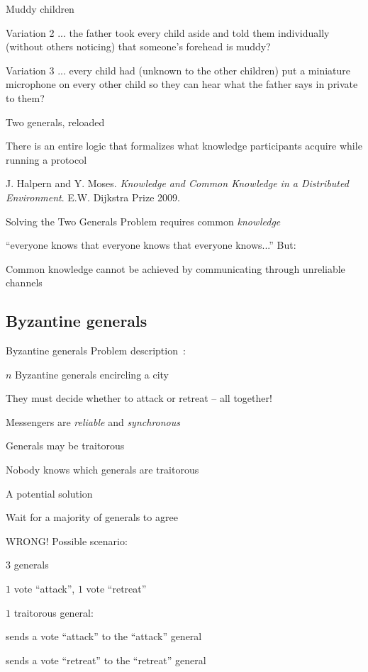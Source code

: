 \begin{frame}{Muddy children}
\begin{block}{Variation 2}
... the father took every child aside and told them individually (without others noticing) that someone’s forehead is muddy?
\end{block}
\begin{block}{Variation 3}
... every child had (unknown to the other children) put a miniature microphone on every other child so they can hear what the father says in private to them?
\end{block}
\end{frame}

\begin{frame}{Two generals, reloaded}
\BI
\item There is an entire logic that formalizes what knowledge participants acquire while running a protocol
\item J. Halpern and Y. Moses. \emph{Knowledge and Common Knowledge in a Distributed Environment}. E.W. Dijkstra Prize 2009.
\item Solving the Two Generals Problem requires common \emph{knowledge}
\BI
\item  “everyone knows that everyone knows that everyone knows...” 
\EI
\EI
\bigskip
But:
\BI
\item Common knowledge cannot be achieved by communicating through unreliable channels
\EI


\end{frame}

\subsection{Byzantine generals}

\begin{frame}{Byzantine generals}
Problem description~\cite{pearls-of-theory}:
\BI
\item $n$ Byzantine generals encircling a city
\item They must decide whether to attack or retreat -- all together!
\item Messengers are \emph{reliable} and \emph{synchronous}
\item Generals may be traitorous
\item Nobody knows which generals are traitorous
\EI	
\end{frame}

\begin{frame}{A potential solution}

\BI
\item Wait for a majority of generals to agree
\EI

\pause
\bigskip
WRONG! Possible scenario:
\BI
\item $3$ generals
\item $1$ vote “attack”, $1$ vote “retreat”
\item $1$ traitorous general:
\BI
\item sends a vote “attack” to the “attack” general
\item sends a vote “retreat” to the “retreat” general
\EI
\EI

\end{frame}

